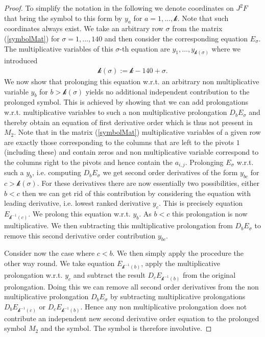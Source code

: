\documentclass[a4paper,12pt, DIV=14, BCOR=5mm, twoside, headsepline, numbers=noenddot]{scrbook}
\begin{document}
\begin{proof}
To simplify the notation in the following we denote coordinates on $J^2F$ that bring the symbol to this form by $y_a$ for $a = 1,...,\mathcal{k}$. Note that such coordinates always exist. We take an arbitrary row $\sigma$ from the matrix (\ref{symbolMat}) for $\sigma=1,...,140$ and then consider the corresponding equation $E_{\sigma}$. The multiplicative variables of this $\sigma$-th equation are $y_1,...,y_{\mathcal{k}(\sigma)}$ where we introduced 
\begin{align}
\mathcal{k}(\sigma):= \mathcal{k} -140 + \sigma.
\end{align}
We now show that prolonging this equation w.r.t. an arbitrary non multiplicative variable $y_b$ for $b>\mathcal{k}(\sigma)$ yields no additional independent contribution to the prolonged symbol. This is achieved by showing that we can add prolongations w.r.t. multiplicative variables to such a non multiplicative prolongation $D_bE_{\sigma}$ and thereby obtain an equation of first derivative order which is thus not present in $M_2$. Note that in the matrix (\ref{symbolMat}) multiplicative variables of a given row are exactly those corresponding to the columns that are left to the pivots $1$ (including these) and contain zeros and non multiplicative variable correspond to the columns right to the pivots and hence contain the $a_{i,j}$. Prolonging $E_{\sigma}$ w.r.t. such a $y_b$, i.e. computing $D_bE_{\sigma}$ we get second order derivatives of the form $y_{bc}$ for $c > \mathcal{k}(\sigma) $. For these derivatives there are now essentially two possibilities, either $b<c$ then we can get rid of this contribution by considering the equation with leading derivative, i.e. lowest ranked derivative $y_c$. This is precisely equation $E_{\mathcal{k}^{-1}(c)}$. We prolong this equation w.r.t. $y_b$. As $b<c$ this prolongation is now multiplicative. We then subtracting this multiplicative prolongation from $D_bE_{\sigma}$ to remove this second derivative order contribution $y_{bc}$.

Consider now the case where $c<b$. We then simply apply the procedure the other way round. We take equation $E_{\mathcal{k}^{-1}(b)}$, apply the multiplicative prolongation w.r.t. $y_c$ and subtract the result $D_cE_{\mathcal{k}^{-1}(b)}$ from the original prolongation. Doing this we can remove all second order derivatives from the non multiplicative prolongation $D_bE_{\sigma}$ by subtracting  multiplicative prolongations $D_bE_{\mathcal{k}^{-1}(c)}$ or $D_cE_{\mathcal{k}^{-1}(b)}$. Hence any non multiplicative prolongation does not contribute an independent new second derivative order equation to the prolonged symbol $M_2$ and the symbol. The symbol is therefore involutive. 


\end{proof}
\end{document}
